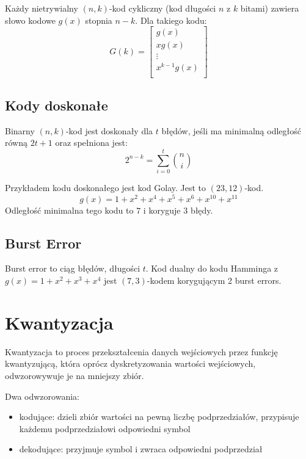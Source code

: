 \documentclass{../notatki}
\begin{document}
Każdy nietrywialny $(n, k)$-kod cykliczny (kod długości $n$ z $k$ bitami)
zawiera słowo kodowe $g(x)$ stopnia $n - k$. Dla takiego kodu:
$$
G(k) =
\begin{bmatrix}
g(x) \\
xg(x) \\
\vdots \\
x^{k - 1}g(x) \\
\end{bmatrix}
$$

\subsection{Kody doskonałe}

Binarny $(n, k)$-kod jest doskonały dla $t$ błędów, jeśli ma minimalną odległość
równą $2t + 1$ oraz spełniona jest:
$$
2^{n - k} = \sum_{i = 0}^{t} \binom{n}{i}
$$

Przykładem kodu doskonałego jest kod Golay. Jest to $(23, 12)$-kod.
$$
g(x) = 1 + x^2 + x^4 + x^5 + x^6 + x^10 + x^11
$$
Odległość minimalna tego kodu to $7$ i koryguje $3$ błędy.

\subsection{Burst Error}

Burst error to ciąg błędów, długości $t$. Kod dualny do kodu Hamminga z
$g(x)=1 + x^2 + x^3 + x^4$ jest $(7,3)$-kodem korygującym 2 burst errors.

\section{Kwantyzacja}

Kwantyzacja to proces przekształcenia danych wejściowych przez
funkcję kwantyzującą,
która oprócz dyskretyzowania wartości wejściowych, odwzorowywuje je na mniejszy
zbiór.

\noindent
Dwa odwzorowania:
\begin{itemize}
\item kodujące: dzieli zbiór wartości na pewną liczbę podprzedziałów,
przypisuje każdemu podprzedziałowi
odpowiedni symbol
\item dekodujące: przyjmuje symbol i zwraca odpowiedni podprzedział
\end{itemize}
\end{document}
